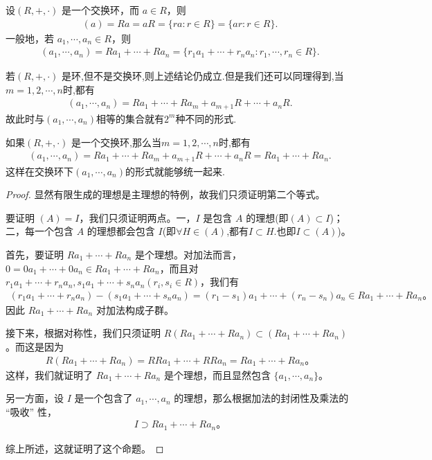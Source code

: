 \documentclass[../../main.tex]{subfiles}
\begin{document}
\begin{proposition}\label{proposition:生成的理想的集合表示}
设$(R, +, \cdot)$ 是一个交换环，而 $a \in R$，则
\begin{align*}
(a) = Ra = aR= \{ra : r \in R\}= \{ar : r \in R\}.
\end{align*}
一般地，若 $a_1, \cdots, a_n \in R$，则
\begin{align*}
(a_1, \cdots, a_n) = Ra_1 + \cdots + Ra_n = \{r_1a_1 + \cdots + r_na_n : r_1, \cdots, r_n \in R\} .
\end{align*}
\end{proposition}
\begin{remark}
若$(R, +, \cdot)$ 是环,但不是交换环,则上述结论仍成立.但是我们还可以同理得到,当$m=1,2,\cdots,n$时,都有
\begin{align*}
\left( a_1,\cdots ,a_n \right) =Ra_1+\cdots +Ra_m+a_{m+1}R+\cdots +a_nR.
\end{align*}
故此时与$(a_1,\cdots,a_n)$相等的集合就有$2^m$种不同的形式.

如果$(R, +, \cdot)$ 是一个交换环,那么当$m=1,2,\cdots,n$时,都有
\begin{align*}
\left( a_1,\cdots ,a_n \right) =Ra_1+\cdots +Ra_m+a_{m+1}R+\cdots +a_nR=Ra_1 + \cdots + Ra_n.
\end{align*}
这样在交换环下$(a_1,\cdots,a_n)$的形式就能够统一起来.
\end{remark}
\begin{proof}
显然有限生成的理想是主理想的特例，故我们只须证明第二个等式。

要证明 $(A) = I$，我们只须证明两点。一，$I$ 是包含 $A$ 的理想(即$(A)\subset I$)；二，每一个包含 $A$ 的理想都会包含 $I$(即$\forall H\in (A)$,都有$I\subset H$.也即$I\subset (A)$)。

首先，要证明 $Ra_1 + \cdots + Ra_n$ 是个理想。对加法而言，$0 = 0a_1 + \cdots + 0a_n \in Ra_1 + \cdots + Ra_n$，而且对 $r_1a_1 + \cdots + r_na_n, s_1a_1 + \cdots + s_na_n (r_i, s_i \in R)$，我们有
\begin{align*}
(r_1a_1 + \cdots + r_na_n) - (s_1a_1 + \cdots + s_na_n) = (r_1 - s_1)a_1 + \cdots + (r_n - s_n)a_n \in Ra_1 + \cdots + Ra_n 。
\end{align*}
因此 $Ra_1 + \cdots + Ra_n$ 对加法构成子群。

接下来，根据对称性，我们只须证明 $R(Ra_1 + \cdots + Ra_n) \subset (Ra_1 + \cdots + Ra_n)$。而这是因为
\begin{align*}
R(Ra_1 + \cdots + Ra_n) = RRa_1 + \cdots + RRa_n = Ra_1 + \cdots + Ra_n 。
\end{align*}
这样，我们就证明了 $Ra_1 + \cdots + Ra_n$ 是个理想，而且显然包含 $\{a_1, \cdots, a_n\}$。

另一方面，设 $I$ 是一个包含了 $a_1, \cdots, a_n$ 的理想，那么根据加法的封闭性及乘法的 “吸收” 性，
\begin{align*}
I \supset Ra_1 + \cdots + Ra_n 。
\end{align*}

综上所述，这就证明了这个命题。 

\end{proof}
\end{document}
